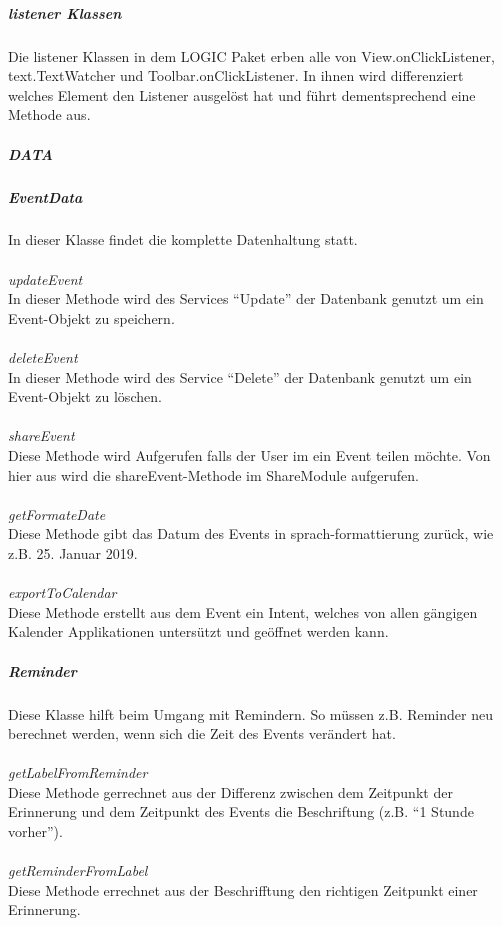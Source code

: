 \subparagraph{listener Klassen}
Die listener Klassen in dem LOGIC Paket erben alle von View.onClickListener, text.TextWatcher und Toolbar.onClickListener. In ihnen wird differenziert welches Element den Listener ausgelöst hat und führt dementsprechend eine Methode aus.


\subparagraph{DATA}
\subparagraph*{EventData}
In dieser Klasse findet die komplette Datenhaltung statt.\\
\\
\textit{updateEvent}\\
In dieser Methode wird des Services ``Update'' der Datenbank genutzt um ein Event-Objekt zu speichern.\\
\\
\textit{deleteEvent}\\
In dieser Methode wird des Service ``Delete'' der Datenbank genutzt um ein Event-Objekt zu löschen.\\
\\
\textit{shareEvent}\\
Diese Methode wird Aufgerufen falls der User im ein Event teilen möchte. Von hier aus wird die shareEvent-Methode im ShareModule aufgerufen.\\
\\
\textit{getFormateDate}\\
Diese Methode gibt das Datum des Events in sprach-formattierung zurück, wie z.B. 25. Januar 2019.\\
\\
\textit{exportToCalendar}\\
Diese Methode erstellt aus dem Event ein Intent, welches von allen gängigen Kalender Applikationen untersützt und geöffnet werden kann.\\
\subparagraph{Reminder}
Diese Klasse hilft beim Umgang mit Remindern. So müssen z.B. Reminder neu berechnet werden, wenn sich die Zeit des Events verändert hat.\\
\\
\textit{getLabelFromReminder}\\
Diese Methode gerrechnet aus der Differenz zwischen dem Zeitpunkt der Erinnerung und dem Zeitpunkt des Events die Beschriftung (z.B. ``1 Stunde vorher'').\\
\\
\textit{getReminderFromLabel}\\
Diese Methode errechnet aus der Beschrifftung den richtigen Zeitpunkt einer Erinnerung.

